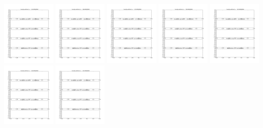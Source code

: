 \documentclass[11pt]{article}
\begin{document}
\vskip 10pt 
\includegraphics[width=0.19\textwidth]{frame0083fig1.png}
\vskip 10pt 
\includegraphics[width=0.19\textwidth]{frame0084fig1.png}
\vskip 10pt 
\includegraphics[width=0.19\textwidth]{frame0085fig1.png}
\vskip 10pt 
\includegraphics[width=0.19\textwidth]{frame0086fig1.png}
\vskip 10pt 
\includegraphics[width=0.19\textwidth]{frame0087fig1.png}
\vskip 10pt 
\includegraphics[width=0.19\textwidth]{frame0088fig1.png}
\vskip 10pt 
\includegraphics[width=0.19\textwidth]{frame0089fig1.png}
\end{document}
